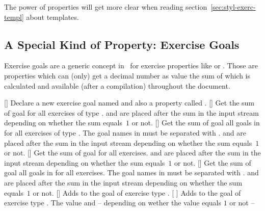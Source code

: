 \documentclass{xsim-manual}
\begin{document}
The power of properties will get more clear when reading
section~\vref{sec:styl-exerc-templ} about templates.

\subsection[Exercise Goals]{A Special Kind of Property: Exercise Goals}\label{sec:goals}

Exercise goals are a generic concept in \xsim\ for exercise properties like
 or .  Those are properties which can
(only) get a decimal number as value the sum of which is calculated and
available (after a compilation) throughout the document.
\begin{commands}
  []
    Declare a new exercise goal named  and also a property called
    .
  []
    Get the sum of goal  for all exercises of type .
     and  are placed after the sum in the input
    stream depending on whether the sum equals~$1$ or not.
    []
    Get the sum of goal all goals in  for all exercises of
    type .  The goal names in  must be
    separated with \code{+}.  and  are placed
    after the sum in the input stream depending on whether the sum equals~$1$
    or not.
  []
    Get the sum of goal  for all exercises.  and
     are placed after the sum in the input stream depending on
    whether the sum equals~$1$ or not.
  []
    Get the sum of goal all goals in  for all exercises.
    The goal names in  must be separated with
    \code{+}.  and  are placed after the sum in
    the input stream depending on whether the sum equals~$1$ or not.
  []
    Adds  to the goal  of exercise type .
  [%
    ]
    Adds  to the goal  of exercise type .
    The value and -- depending on wether the value equals $1$ or not --

\end{commands}
\end{document}
